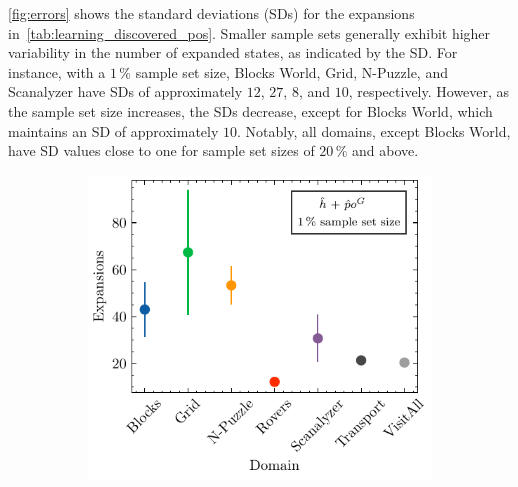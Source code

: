 \documentclass[ppgc,diss,english]{iiufrgs}
\begin{document}
\cref{fig:errors} shows the standard deviations (SDs) for the expansions in~\cref{tab:learning_discovered_pos}. Smaller sample sets generally exhibit higher variability in the number of expanded states, as indicated by the SD. For instance, with a $1\,\%$ sample set size, Blocks World, Grid, N-Puzzle, and Scanalyzer have SDs of approximately $12$, $27$, $8$, and $10$, respectively. However, as the sample set size increases, the SDs decrease, except for Blocks World, which maintains an SD of approximately $10$. Notably, all domains, except Blocks World, have SD values close to one for sample set sizes of $20\,\%$ and above.

\begin{figure}[tb]
  \caption[Standard deviation of expansions using \pog]{Mean number of expansions and its standard deviation per domain for GBFS guided by different heuristics with \pog trained using sample sets of different sizes.}
  \centering
  \vspace{\baselineskip}
  \begin{subfigure}{0.41\textwidth}
    \centering
    \includegraphics[width=\linewidth]{img/error_hNN_poG_1pct.pdf}
  \end{subfigure}
  \begin{subfigure}{0.41\textwidth}
    \centering

\end{subfigure}
\end{figure}
\end{document}
